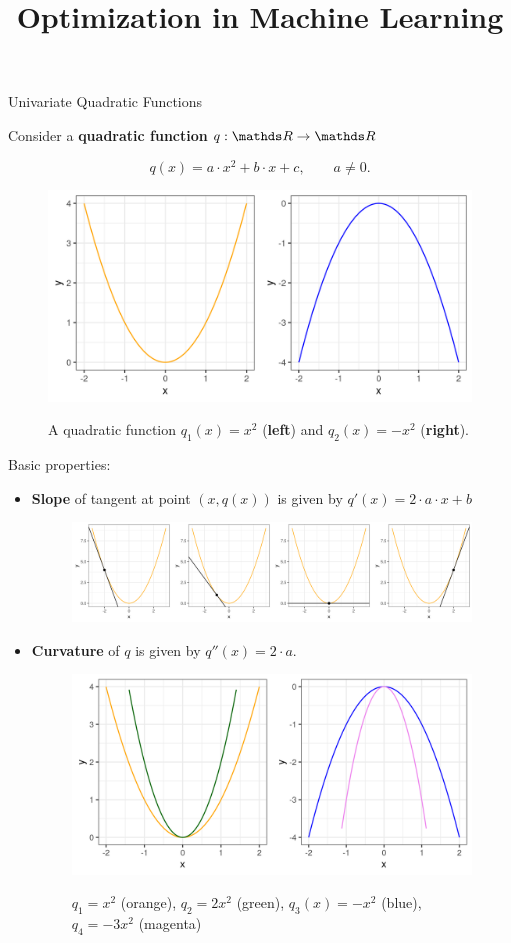 \documentclass[11pt,compress,t,notes=noshow, xcolor=table]{beamer}
\title{Optimization in Machine Learning}
\date{}
\begin{document}
\sloppy

\begin{vbframe}{Univariate Quadratic Functions}

Consider a \textbf{quadratic function} $q: \R \to \R$

$$
q(x) = a \cdot x^2 + b \cdot x + c, \qquad a \ne 0.
$$


\begin{figure}
    \includegraphics[height=0.3\textwidth, keepaspectratio]{figure_man/quadratic_functions_1D.png} \\
    \caption*{A quadratic function $q_1(x) = x^2$ (\textbf{left}) and $q_2(x) = - x^2$ (\textbf{right}).}
\end{figure}

\framebreak 

Basic properties: 

\begin{itemize}
    \item \textbf{Slope} of tangent at point $(x, q(x))$ is given by $q'(x) = 2 \cdot a \cdot x + b$
        \begin{figure}
            \includegraphics[height=0.2\textwidth, keepaspectratio]{figure_man/quadratic_functions_1D_derivative.png} \\
        \end{figure}
    \item \textbf{Curvature} of $q$ is given by $q''(x) = 2\cdot a$. 
        \begin{figure}
            \includegraphics[height=0.2\textwidth, keepaspectratio]{figure_man/quadratic_functions_1D_curvature.png} \\
            \caption*{\footnotesize $q_1 = x^2$ (orange), $q_2 = 2 x^2$ (green), $q_3 (x) = - x^2$ (blue), $q_4 = - 3 x^2$ (magenta)}
        \end{figure}


\end{itemize}
\end{vbframe}
\end{document}
